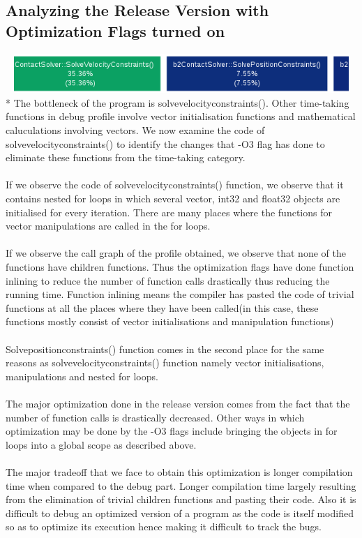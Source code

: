 \documentclass[11pt]{article}
\begin{document}
\subsection{Analyzing the Release Version with Optimization Flags turned on}
\includegraphics[height=1.5cm,width=15cm]{doc/optimized}
\\*
The bottleneck of the program is solvevelocityconstraints(). Other time-taking functions in debug profile involve vector initialisation functions and mathematical caluculations involving vectors. We now examine the code of solvevelocityconstraints() to identify the changes that -O3 flag has done to eliminate these functions from the time-taking category.  
\\
\\
If we observe the code of solvevelocityconstraints() function, we observe that it contains nested for loops in which several vector, int32 and float32 objects are initialised for every iteration. There are many places where the functions for vector manipulations are called in the for loops. 
\\
\\
If we observe the call graph of the profile obtained, we observe that none of the functions have children functions. Thus the optimization flags have done function inlining to reduce the number of function calls drastically thus reducing the running time. Function inlining means the compiler has pasted the code of trivial functions at all the places where they have been called(in this case, these functions mostly consist of vector initialisations and manipulation functions)
\\
\\
Solvepositionconstraints() function comes in the second place for the same reasons as solvevelocityconstraints() function namely vector initialisations, manipulations and nested for loops.
\\
\\
The major optimization done in the release version comes from the fact that the number of function calls is drastically decreased. Other ways in which optimization may be done by the -O3 flags include bringing the objects in for loops into a global scope as described above.
\\
\\
The major tradeoff that we face to obtain this optimization is longer compilation time when compared to the debug part. Longer compilation time largely resulting from the elimination of trivial children functions and pasting their code. Also it is difficult to debug an optimized version of a program as the code is itself modified so as to optimize its execution hence making it difficult to track the bugs.



\end{document}
